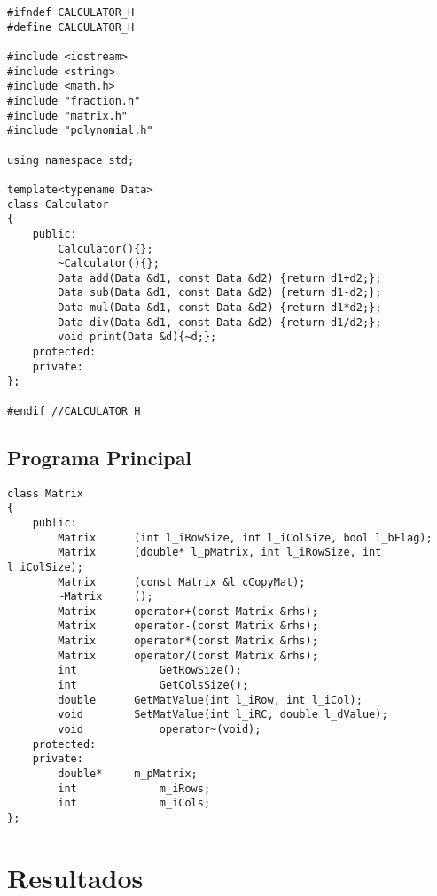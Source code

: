 \begin{verbatim}
#ifndef CALCULATOR_H
#define CALCULATOR_H

#include <iostream>
#include <string>
#include <math.h>
#include "fraction.h"
#include "matrix.h"
#include "polynomial.h"

using namespace std;

template<typename Data>
class Calculator
{
	public:
		Calculator(){};
		~Calculator(){};
		Data add(Data &d1, const Data &d2) {return d1+d2;};
		Data sub(Data &d1, const Data &d2) {return d1-d2;};
		Data mul(Data &d1, const Data &d2) {return d1*d2;};
		Data div(Data &d1, const Data &d2) {return d1/d2;};
		void print(Data &d){~d;};
	protected:
	private:
};

#endif //CALCULATOR_H
\end{verbatim}

\subsection{Programa Principal}

\begin{verbatim}
class Matrix
{
	public:
		Matrix		(int l_iRowSize, int l_iColSize, bool l_bFlag);
		Matrix		(double* l_pMatrix, int l_iRowSize, int l_iColSize);
		Matrix		(const Matrix &l_cCopyMat);
		~Matrix		();
		Matrix 		operator+(const Matrix &rhs);
		Matrix 		operator-(const Matrix &rhs);
		Matrix 		operator*(const Matrix &rhs);
		Matrix 		operator/(const Matrix &rhs);
		int 			GetRowSize();
		int 			GetColsSize();
		double 		GetMatValue(int l_iRow, int l_iCol);
		void  		SetMatValue(int l_iRC, double l_dValue);
		void 			operator~(void);
	protected:
	private:
		double* 	m_pMatrix;
		int 			m_iRows;
		int 			m_iCols;
};
\end{verbatim}

\section{Resultados}


